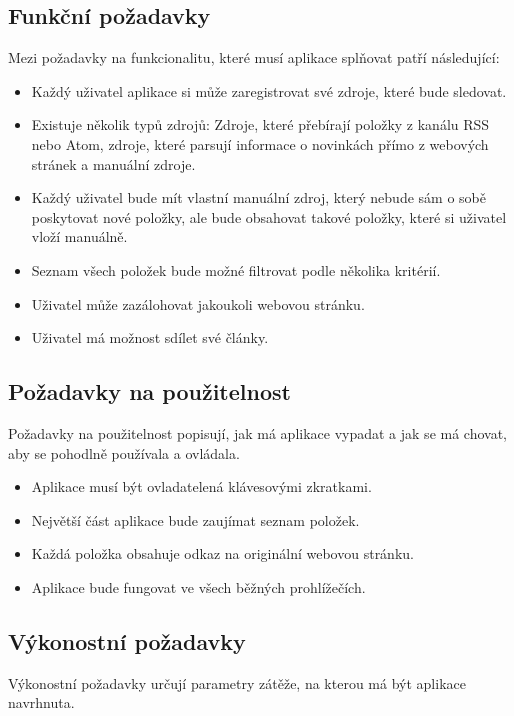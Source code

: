 \subsection{Funkční požadavky}

Mezi požadavky na funkcionalitu, které musí aplikace splňovat patří následující:

\begin{itemize}
    \item Každý uživatel aplikace si může zaregistrovat své zdroje, které bude sledovat.
    \item Existuje několik typů zdrojů: Zdroje, které přebírají položky z kanálu RSS nebo Atom, zdroje, které parsují informace o novinkách přímo z webových stránek a manuální zdroje.
    \item Každý uživatel bude mít vlastní manuální zdroj, který nebude sám o sobě poskytovat nové položky, ale bude obsahovat takové položky, které si uživatel vloží manuálně.
    \item Seznam všech položek bude možné filtrovat podle několika kritérií.
	\item Uživatel může zazálohovat jakoukoli webovou stránku.
	\item Uživatel má možnost sdílet své články.
\end{itemize}

\subsection{Požadavky na použitelnost}

Požadavky na použitelnost popisují, jak má aplikace vypadat a jak se má chovat, aby se pohodlně používala a ovládala.

\begin{itemize}
    \item Aplikace musí být ovladatelená klávesovými zkratkami.
    \item Největší část aplikace bude zaujímat seznam položek.
    \item Každá položka obsahuje odkaz na originální webovou stránku.
    \item Aplikace bude fungovat ve všech běžných prohlížečích.
\end{itemize}

\subsection{Výkonostní požadavky}

Výkonostní požadavky určují parametry zátěže, na kterou má být aplikace navrhnuta.

